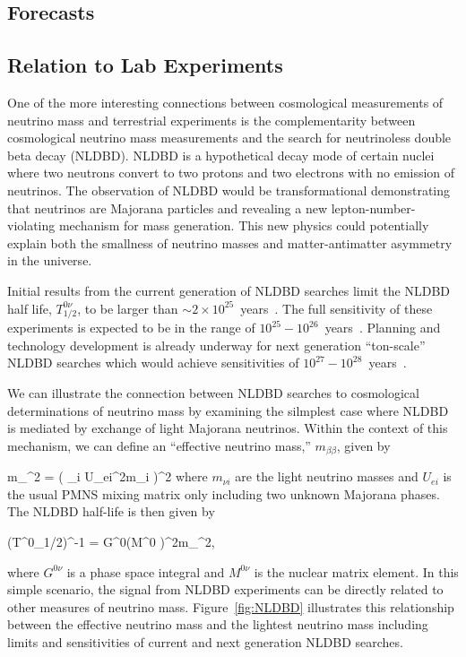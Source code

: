 \subsection{Forecasts}

\subsection{Relation to Lab Experiments}\label{sec:lab}

One of the more interesting connections between cosmological measurements of neutrino mass and terrestrial experiments is the complementarity between cosmological neutrino mass measurements and the search for neutrinoless double beta decay (NLDBD). NLDBD is a hypothetical decay mode of certain nuclei where two neutrons convert to two protons and two electrons with no emission of neutrinos. The observation of NLDBD would be transformational demonstrating that neutrinos are Majorana particles and revealing a new lepton-number-violating mechanism for mass generation. This new physics could potentially explain both the smallness of neutrino masses and matter-antimatter asymmetry in the universe.

Initial results from the current generation of NLDBD searches limit the NLDBD half life, $T^{0\nu}_{1/2}$, to be larger than  $\sim2\times10^{25}$~years~\cite{Agostini:2013mzu,Auger:2012ar,Artusa:2014lgv}.%
 The full sensitivity of these experiments is expected to be in the range of $10^{25}-10^{26}$~years~\cite{NSAC}. Planning and technology development is already underway for next generation ``ton-scale'' NLDBD searches which would achieve sensitivities of $10^{27}-10^{28}$~years~\cite{NSAC}.

We can illustrate the connection between NLDBD searches to cosmological determinations of neutrino mass by examining the silmplest case where NLDBD is mediated by exchange of light Majorana neutrinos. Within the context of this mechanism, we can define an ``effective neutrino mass,'' $m_{\beta\beta}$, given by 

\beq
m_{\beta\beta}^{2} = ( \sum_i U_{ei}^{2}m_{\nu i} )^{2}
\label{eq:mbb}
\eeq
where $m_{\nu i}$ are the light neutrino masses and $U_{ei}$ is the usual PMNS mixing matrix only including two unknown Majorana phases. The NLDBD half-life is then given by 

\beq
(T^{0\nu}_{1/2})^{-1} = G^{0\nu}\cdot (M^{0\nu} )^{2}\cdot m_{\beta\beta}^2,
\eeq

where $G^{0\nu}$ is a phase space integral and $M^{0\nu}$ is the nuclear matrix element. In this simple scenario, the signal from NLDBD experiments can be directly related to other measures of neutrino mass. Figure~\ref{fig:NLDBD} illustrates this relationship between the effective neutrino mass and the lightest neutrino mass including limits and sensitivities of current and next generation NLDBD searches.

